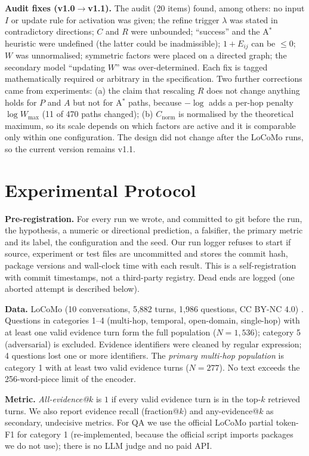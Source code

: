 \documentclass[10pt]{article}
\newcommand{\cn}{C_{\mathrm{norm}}}
\begin{document}
\textbf{Audit fixes (v1.0$\to$v1.1).} The audit (20 items) found, among others: no input $I$ or update rule for activation was given; the refine trigger $\lambda$ was stated in contradictory directions; $C$ and $R$ were unbounded; ``success'' and the A$^*$ heuristic were undefined (the latter could be inadmissible); $1+E_{ij}$ can be $\le 0$; $W$ was unnormalised; symmetric factors were placed on a directed graph; the secondary model ``updating $W$'' was over-determined. Each fix is tagged mathematically required or arbitrary in the specification. Two further corrections came from experiments: (a) the claim that rescaling $R$ does not change anything holds for $P$ and $A$ but not for A$^*$ paths, because $-\log$ adds a per-hop penalty $\log W_{\max}$ (11 of 470 paths changed); (b) $\cn$ is normalised by the theoretical maximum, so its scale depends on which factors are active and it is comparable only within one configuration. The design did not change after the LoCoMo runs, so the current version remains v1.1.

\section{Experimental Protocol}\label{sec:protocol}
\textbf{Pre-registration.} For every run we wrote, and committed to git before the run, the hypothesis, a numeric or directional prediction, a falsifier, the primary metric and its label, the configuration and the seed. Our run logger refuses to start if source, experiment or test files are uncommitted and stores the commit hash, package versions and wall-clock time with each result. This is a self-registration with commit timestamps, not a third-party registry. Dead ends are logged (one aborted attempt is described below).

\textbf{Data.} LoCoMo (10 conversations, 5{,}882 turns, 1{,}986 questions, CC BY-NC 4.0) \cite{maharana2024locomo}. Questions in categories 1--4 (multi-hop, temporal, open-domain, single-hop) with at least one valid evidence turn form the full population ($N=1{,}536$); category 5 (adversarial) is excluded. Evidence identifiers were cleaned by regular expression; 4 questions lost one or more identifiers. The \emph{primary multi-hop population} is category 1 with at least two valid evidence turns ($N=277$). No text exceeds the 256-word-piece limit of the encoder.

\textbf{Metric.} \emph{All-evidence@$k$} is $1$ if every valid evidence turn is in the top-$k$ retrieved turns. We also report evidence recall (fraction@$k$) and any-evidence@$k$ as secondary, undecisive metrics. For QA we use the official LoCoMo partial token-F1 for category 1 (re-implemented, because the official script imports packages we do not use); there is no LLM judge and no paid API.
\end{document}

